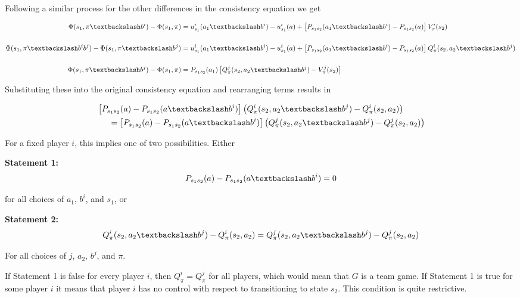 Following a similar process for the other differences in the consistency equation we get

\begin{align*}
\Phi(s_1,\asub{\pi}{b^i}) - \Phi(s_1,\pi) &= u^i_{s_1}(\asub{a_1}{b^i}) - u^i_{s_1}(a) + \left[P_{s_1s_2}(\asub{a_1}{b^i}) - P_{s_1s_2}(a)\right] V^i_{\pi}(s_2) \\
&\\
\Phi(s_1,\asub{\pi}{b^ib^j}) - \Phi(s_1,\asub{\pi}{b^j}) &= u^i_{s_1}(\asub{a_1}{b^i}) - u^i_{s_1}(a) + \left[P_{s_1s_2}(\asub{a_1}{b^i}) - P_{s_1s_2}(a)\right] Q^i_{\pi}(s_2, \asub{a_2}{b^j})\\
&\\
\Phi(s_1,\asub{\pi}{b^j}) - \Phi(s_1,\pi) &= P_{s_1s_2}(a_1) \left[Q^j_{\pi}(s_2, \asub{a_2}{b^j}) - V^j_{\pi}(s_2)\right]
\end{align*}


Substituting these into the original consistency equation and rearranging terms results in

\begin{eqnarray*}
&\left[P_{s_1s_2}(a) - P_{s_1s_2}(\asub{a}{b^i}) \right]\left(Q^i_{\pi}(s_2, \asub{a_2}{b^j}) - Q^i_{\pi}(s_2, a_2)\right) \\
& \hspace{.5cm} = \left[P_{s_1s_2}(a) - P_{s_1s_2}(\asub{a}{b^i}) \right]\left(Q^j_{\pi}(s_2, \asub{a_2}{b^j}) - Q^j_{\pi}(s_2, a_2)\right)
\end{eqnarray*}

For a fixed player $i$, this implies one of two possibilities. Either

{\bf Statement 1:}
\begin{equation}
P_{s_1s_2}(a) - P_{s_1s_2}(\asub{a}{b^i}) = 0
\label{eq:noeffect}
\end{equation}

for all choices of $a_1$, $b^i$, and $s_1$, or

{\bf Statement 2: }
\begin{equation}
Q^i_{\pi}(s_2, \asub{a_2}{b^j}) - Q^i_{\pi}(s_2, a_2) = Q^j_{\pi}(s_2, \asub{a_2}{b^j}) - Q^j_{\pi}(s_2, a_2)
\label{eq:team}
\end{equation}

For all choices of $j$, $a_2$, $b^j$, and $\pi$.  

If Statement 1 is false for every player $i$, then $Q^i_{\pi} = Q^j_{\pi}$ for all players, which would mean that $G$ is a team game. If Statement 1 is true for some player $i$ it means that player $i$ has no control with respect to transitioning to state $s_2$. This condition is quite restrictive.



